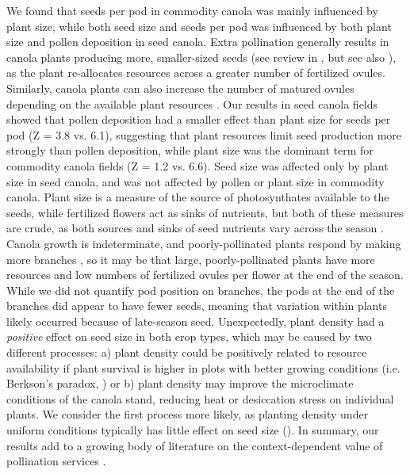 \documentclass[12pt]{article} %
\begin{document}
We found that seeds per pod in commodity canola was mainly influenced by plant size, while both seed size and seeds per pod was influenced by both plant size and pollen deposition in seed canola. 
Extra pollination generally results in canola plants producing more, smaller-sized seeds (see review in \citealt{ouvrard2019}, but see also \citealt{koltowski2005}), as the plant re-allocates resources across a greater number of fertilized ovules.
Similarly, canola plants can also increase the number of matured ovules depending on the available plant resources \citep{bouttier1992, kirkegaard2018}.
Our results in seed canola fields showed that pollen deposition had a smaller effect than plant size for seeds per pod (Z = 3.8 vs. 6.1), suggesting that plant resources limit seed production more strongly than pollen deposition, while plant size was the dominant term for commodity canola fields (Z = 1.2 vs. 6.6).
Seed size was affected only by plant size in seed canola, and was not affected by pollen or plant size in commodity canola. 
Plant size is a measure of the source of photosynthates available to the seeds, while fertilized flowers act as sinks of nutrients, but both of these measures are crude, as both sources and sinks of seed nutrients vary across the season \citep{clarke1979, zhang2018}.
Canola growth is indeterminate, and poorly-pollinated plants respond by making more branches \citep{mesquida1981, sabbahi2006}, so it may be that large, poorly-pollinated plants have more resources and low numbers of fertilized ovules per flower at the end of the season.
While we did not quantify pod position on branches, the pods at the end of the branches did appear to have fewer seeds, meaning that variation within plants likely occurred because of late-season seed.
Unexpectedly, plant density had a \emph{positive} effect on seed size in both crop types, which may be caused by two different processes: a) plant density could be positively related to resource availability if plant survival is higher in plots with better growing conditions (i.e. Berkson's paradox, \citep{snoep2014}) or b) plant density may improve the microclimate conditions of the canola stand, reducing heat or desiccation stress on individual plants.
We consider the first process more likely, as planting density under uniform conditions typically has little effect on seed size (\citealt{Angadi2003}).
In summary, our results add to a growing body of literature on the context-dependent value of pollination services \citep{marini2015, tamburini2017, tamburini2019}.
\end{document}
